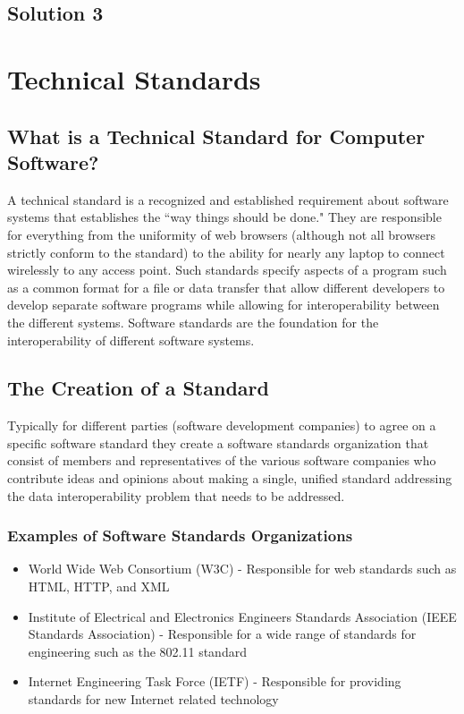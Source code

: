 \documentclass[14pt]{article}
\begin{document}
\subsection{Solution 3}

\newpage

\section{Technical Standards}
\label{sec:TechnicalStandards}

\subsection{What is a Technical Standard for Computer Software?}
A technical standard is a recognized and established requirement about software systems that establishes the ``way things should be done." They are responsible for everything from the uniformity of web browsers (although not all browsers strictly conform to the standard) to the ability for nearly any laptop to connect wirelessly to any access point. Such standards specify aspects of a program such as a common format for a file or data transfer that allow different developers to develop separate software programs while allowing for \gls{interoperability} between the different systems. Software standards are the foundation for the \gls{interoperability} of different software systems.

\subsection{The Creation of a Standard}
Typically for different parties (software development companies) to agree on a specific software standard they create a software standards organization that consist of members and representatives of the various software companies who contribute ideas and opinions about making a single, unified standard addressing the data \gls{interoperability} problem that needs to be addressed.

\subsubsection{Examples of Software Standards Organizations}

\begin{itemize}
\item World Wide Web Consortium (W3C) - Responsible for web standards such as HTML, HTTP, and XML 
\item Institute of Electrical and Electronics Engineers Standards Association (IEEE Standards Association) - Responsible for a wide range of standards for engineering such as the 802.11 standard
\item Internet Engineering Task Force (IETF) - Responsible for providing standards for new Internet related technology 
\end{itemize}
\end{document}
